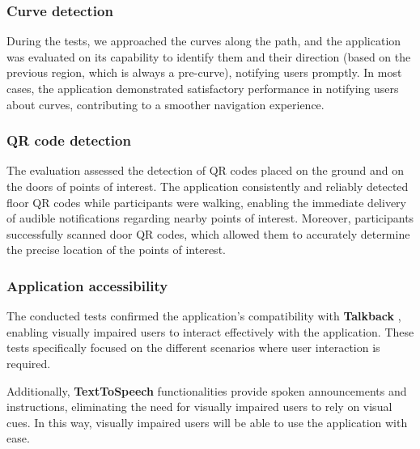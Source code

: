 \subsubsection{Curve detection}
During the tests, we approached the curves along the path, and the application was evaluated on its capability to identify them and their direction (based on the previous region, which is always a pre-curve),  notifying users promptly. 
In most cases, the application demonstrated satisfactory performance in notifying users about curves, contributing to a smoother navigation experience.

\subsubsection{QR code detection}
The evaluation assessed the detection of QR codes placed on the ground and on the doors of points of interest. The application consistently and reliably detected floor QR codes while participants were walking, enabling the immediate delivery of audible notifications regarding nearby points of interest. Moreover, participants successfully scanned door QR codes, which allowed them to accurately determine the precise location of the points of interest.

\subsubsection{Application accessibility}
The conducted tests confirmed the application's compatibility with \textbf{Talkback} \cite{android:accessibility}, enabling visually impaired users to interact effectively with the application. 
These tests specifically focused on the different scenarios where user interaction is required. 

Additionally, \textbf{TextToSpeech} \cite{android:text-to-speech-ref} functionalities provide spoken announcements and instructions, eliminating the need for visually impaired users to rely on visual cues. In this way, visually impaired users will be able to use the application with ease.

